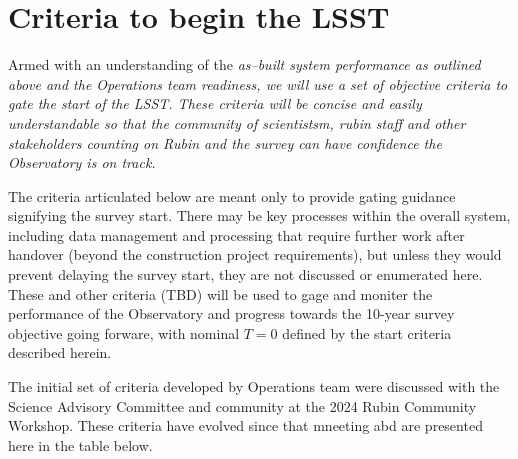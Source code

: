 \section{Criteria to begin the LSST}

Armed with an understanding of the \it{as--built} system performance as outlined above and the Operations team readiness, we will use a set of objective criteria to gate the start of the LSST. These criteria will be concise and easily understandable so that the community of scientistsm, rubin staff and other stakeholders counting on Rubin and the survey can have confidence the Observatory is on track.

The criteria articulated below are meant only to provide gating guidance signifying the survey start. There may be key processes within the overall system, including data management and processing that require further work after handover (beyond the construction project requirements), but unless they would prevent delaying the survey start, they are not discussed or enumerated here.  These and other criteria (TBD) will be used to gage and moniter the performance of the Observatory and progress towards the 10-year survey objective going forware, with nominal $T=0$ defined by the start criteria described herein.

The initial set of criteria developed by Operations team were discussed with the Science Advisory Committee and community at the 2024 Rubin Community Workshop. These criteria have evolved since that mneeting abd are presented here in the table below.

